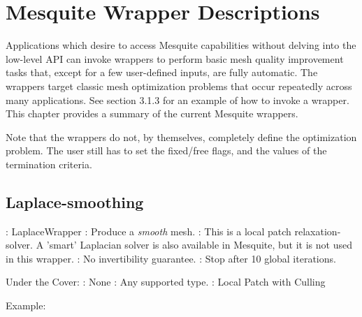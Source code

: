 \chapter{Mesquite Wrapper Descriptions}
\label{sec:wrappers}

Applications which desire to access Mesquite capabilities without delving
into the low-level API can invoke wrappers to perform basic mesh quality
improvement tasks that, except for a few user-defined inputs, are fully
automatic. The wrappers target classic mesh optimization problems that occur
repeatedly across many applications. See section 3.1.3 for an example of how
to invoke a wrapper.
This chapter provides a summary of the current Mesquite wrappers. \newline

\noindent Note that the wrappers do not, by themselves, completely define
the optimization problem.  The user still has to set the fixed/free flags,
and the values of the termination criteria.  \newline

\section{Laplace-smoothing} \label{sec:LaplaceWrapper}

: LaplaceWrapper \newline
{}: Produce a {\it smooth} mesh. \newline
{}: This is a local patch relaxation-solver. A 'smart'
Laplacian solver is also available in Mesquite, but it is not used in this
wrapper.  \newline
{}: No invertibility guarantee. \newline
{}: Stop after 10 global iterations. \newline \newline

\noindent Under the Cover: \newline
{}: None \newline
{}: Any supported type. \newline
{}: Local Patch with Culling \newline

\noindent Example: \newline

